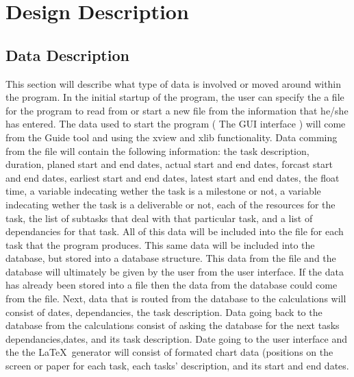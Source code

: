 \section{Design Description}
        \subsection{Data Description}
This section will describe what type of data is involved or moved
around within the program. In the initial startup of the program,
the user can specify the a file for the program to read from or start
a new file from the information that he/she has entered. The data used
to start the program ( The GUI interface ) will come from the Guide tool
and using the xview and xlib functionality. Data comming from the
file will contain the following information: the task description,
duration, planed start and end dates, actual start and end dates, forcast
start and end dates, earliest start and end dates, latest start and end
dates, the float time, a variable indecating wether the task is a milestone
or not, a variable indecating wether the task is a deliverable or not, each
of the resources for the task, the list of subtasks that deal with that
particular task, and a list of dependancies for that task. All of this data
will be included into the file for each task that the program produces.
This same data will be included into the database, but stored into a
database structure. This data from the file and the database will
ultimately be given by the user from the user interface. If the data has
already been stored into a file then the data from the database could come
from the file. Next, data that is routed from the database to
the calculations will consist of dates, dependancies, the task description.
Data going back to the database from the calculations consist of asking the
database for the next tasks dependancies,dates, and its task description.
Date going to the user interface and the the \LaTeX\ generator will consist
of formated chart data (positions on the screen or paper for each task,
each tasks' description, and its start and end dates.
